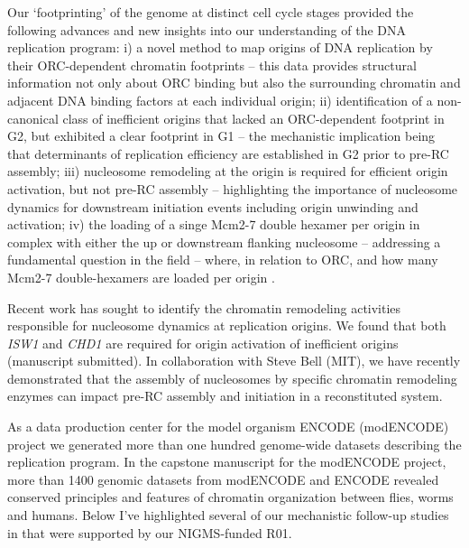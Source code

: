 Our `footprinting' of the \scer genome at distinct cell cycle stages provided the  %
following advances and new insights into our understanding of the DNA replication program: i) a novel method to map origins of DNA replication by their ORC-dependent chromatin footprints -- this data provides structural information not only about ORC binding but also the surrounding chromatin and adjacent DNA binding factors at each individual origin; ii) identification of a non-canonical class of inefficient origins that lacked an ORC-dependent footprint in G2, but exhibited a clear footprint in G1 -- the mechanistic implication being that determinants of replication efficiency are established in G2 prior to pre-RC assembly; iii) nucleosome remodeling at the origin is required for efficient origin activation, but not pre-RC assembly -- highlighting the importance of nucleosome dynamics for downstream initiation events including origin unwinding and activation; iv) the loading of a singe Mcm2-7 double hexamer per origin in complex with either the up or downstream flanking nucleosome -- addressing a fundamental question in the field -- where, in relation to ORC, and how many Mcm2-7 double-hexamers are loaded per origin \invivo. 

Recent work has sought to identify the chromatin remodeling activities responsible for nucleosome dynamics at replication origins.  %
We found that both \textit{ISW1} and \textit{CHD1}  are required for origin activation of inefficient origins (manuscript submitted). In collaboration with Steve Bell (MIT), we have recently demonstrated that the \invitro assembly of nucleosomes by specific chromatin remodeling enzymes can impact pre-RC assembly and initiation in a reconstituted system\citep{Azmi2017-gg}.

As a data production center for the model organism ENCODE (modENCODE) project we generated more than one hundred genome-wide datasets describing the \dros replication program\citep{Mod_Encode_Consortium2010-io}.  In the capstone manuscript for the modENCODE project, more than 1400 genomic datasets from modENCODE and ENCODE revealed conserved principles and features of chromatin organization between flies, worms and humans\citep{Ho2014-xa}. %
Below I've highlighted several of our mechanistic follow-up studies in \dros that were supported by our NIGMS-funded R01.

